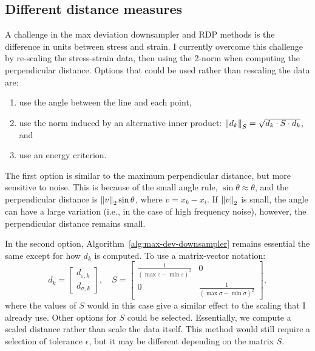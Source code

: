 \documentclass[a4paper,11pt]{article}
\begin{document}
\subsection{Different distance measures}

A challenge in the max deviation downsampler and RDP methods is the difference in units between stress and strain.
I currently overcome this challenge by re-scaling the stress-strain data, then using the 2-norm when computing the perpendicular distance.
Options that could be used rather than rescaling the data are:
\begin{enumerate}
    \item use the angle between the line and each point,
    \item use the norm induced by an alternative inner product: $\norm{d_k}_S = \sqrt{d_k \cdot S \cdot d_k}$, and
    \item use an energy criterion.
\end{enumerate}

The first option is similar to the maximum perpendicular distance, but more sensitive to noise.
This is because of the small angle rule, $\sin \theta \approx \theta$, and the perpendicular distance is $\norm{v}_2 \sin \theta$, where $v = x_k - x_i$.
If $\norm{v}_2$ is small, the angle can have a large variation (i.e., in the case of high frequency noise), however, the perpendicular distance remains small.

In the second option, Algorithm~\ref{alg:max-dev-downsampler} remains essential the same except for how $d_k$ is computed.
To use a matrix-vector notation:
\begin{equation*}
    d_k = \begin{bmatrix}
        d_{\varepsilon,k} \\
        d_{\sigma,k}
    \end{bmatrix}, \quad
    S = \begin{bmatrix}
        \frac{1}{(\max \varepsilon - \min \varepsilon)^2} & 0 \\
        0 & \frac{1}{(\max \sigma - \min \sigma)^2}
    \end{bmatrix},
\end{equation*}
where the values of $S$ would in this case give a similar effect to the scaling that I already use.
Other options for $S$ could be selected.
Essentially, we compute a scaled distance rather than scale the data itself.
This method would still require a selection of tolerance $\epsilon$, but it may be different depending on the matrix $S$.
\end{document}
